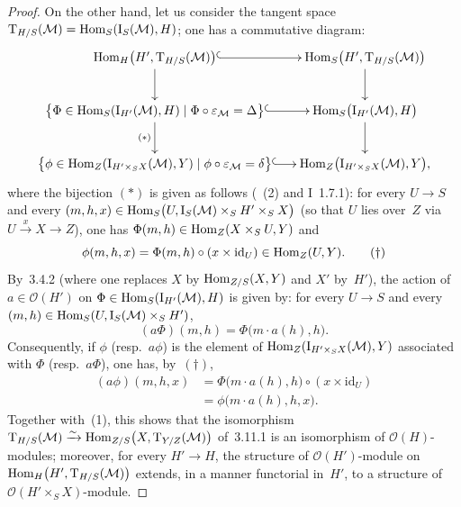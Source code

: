 \begin{proof}
On the other hand, let us consider the tangent space
\(\mathrm{T}_{H/S}(\mathcal{M})=\operatorname{Hom}_{S}(\mathrm{I}_{S}(\mathcal{M}),H)\); one
has a commutative diagram:
\[
\xymatrix@C=1.6em@R=2.4em{
\Hom_{H}\bigl(H',\mathrm{T}_{H/S}(\mathcal{M})\bigr)
  \ar@{^{(}->}[r]\ar[d]
& \Hom_{S}\bigl(H',\mathrm{T}_{H/S}(\mathcal{M})\bigr)\ar[d]\\
\bigl\{\Phi\in\Hom_{S}(\mathrm{I}_{H'}(\mathcal{M}),H)
  \mid\Phi\circ\varepsilon_{\mathcal{M}}=\Delta\bigr\}
  \ar@{^{(}->}[r]\ar[d]_{(\ast)}
& \Hom_{S}\bigl(\mathrm{I}_{H'}(\mathcal{M}),H\bigr)\ar[d]\\
\bigl\{\phi\in\Hom_{Z}(\mathrm{I}_{H'\times_{S}X}(\mathcal{M}),Y)
  \mid\phi\circ\varepsilon_{\mathcal{M}}=\delta\bigr\}
  \ar@{^{(}->}[r]
& \Hom_{Z}\bigl(\mathrm{I}_{H'\times_{S}X}(\mathcal{M}),Y\bigr),
}
\]
where the bijection \((*)\) is given as follows (~(2) and I~1.7.1):
for every \(U\to S\) and every
\((m,h,x)\in\operatorname{Hom}_{S}\bigl(U,\mathrm{I}_{S}(\mathcal{M})\times_{S}H'\times_{S}X\bigr)\)
(so that \(U\) lies over~\(Z\) via \(U\xrightarrow{x}X\to Z\)), one has
\(\Phi(m,h)\in\operatorname{Hom}_{Z}(X\times_{S}U,Y)\) and
\begin{equation}
\phi(m,h,x)=\Phi(m,h)\circ(x\times\mathrm{id}_{U})
\in\operatorname{Hom}_{Z}(U,Y).
\tag{\dag}
\end{equation}
By~3.4.2 (where one replaces \(X\) by \(\operatorname{Hom}_{Z/S}(X,Y)\) and \(X'\)
by~\(H'\)), the action of \(a\in\mathcal{O}(H')\) on
\(\Phi\in\operatorname{Hom}_{S}(\mathrm{I}_{H'}(\mathcal{M}),H)\) is given by: for every
\(U\to S\) and every
\((m,h)\in\operatorname{Hom}_{S}(U,\mathrm{I}_{S}(\mathcal{M})\times_{S}H')\),
\[
(a\Phi)(m,h)=\Phi\bigl(m\cdot a(h),h\bigr).
\]
Consequently, if \(\phi\) (resp.\ \(a\phi\)) is the element of
\(\operatorname{Hom}_{Z}(\mathrm{I}_{H'\times_{S}X}(\mathcal{M}),Y)\) associated with
\(\Phi\) (resp.\ \(a\Phi\)), one has, by~\((\dagger)\),
\begin{equation}
\begin{aligned}
(a\phi)(m,h,x)
&=\Phi\bigl(m\cdot a(h),h\bigr)\circ(x\times\mathrm{id}_{U})\\
&=\phi\bigl(m\cdot a(h),h,x\bigr).
\end{aligned}
\tag{2}
\end{equation}
Together with~(1), this shows that the isomorphism
\(\mathrm{T}_{H/S}(\mathcal{M})\xrightarrow{\sim}
\operatorname{Hom}_{Z/S}\bigl(X,\mathrm{T}_{Y/Z}(\mathcal{M})\bigr)\)
of~3.11.1 is an isomorphism of \(\mathcal{O}(H)\)-modules; moreover, for every
\(H'\to H\), the structure of \(\mathcal{O}(H')\)-module on
\(\operatorname{Hom}_{H}\bigl(H',\mathrm{T}_{H/S}(\mathcal{M})\bigr)\) extends, in a manner
functorial in~\(H'\), to a structure of
\(\mathcal{O}(H'\times_{S}X)\)-module.
\end{proof}

